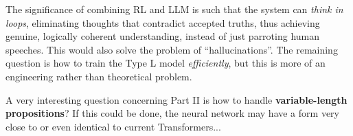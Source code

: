 \documentclass[runningheads]{llncs}
\begin{document}
The significance of combining RL and LLM is such that the system can \textit{think in loops}, eliminating thoughts that contradict accepted truths, thus achieving genuine, logically coherent understanding, instead of just parroting human speeches.  This would also solve the problem of ``hallucinations''.  The remaining question is how to train the Type L model \textit{efficiently}, but this is more of an engineering rather than theoretical problem.

A very interesting question concerning Part II is how to handle \textbf{variable-length propositions}?  If this could be done, the neural network may have a form very close to or even identical to current Transformers...

%
%
%
% 
\printbibliography
\end{document}
